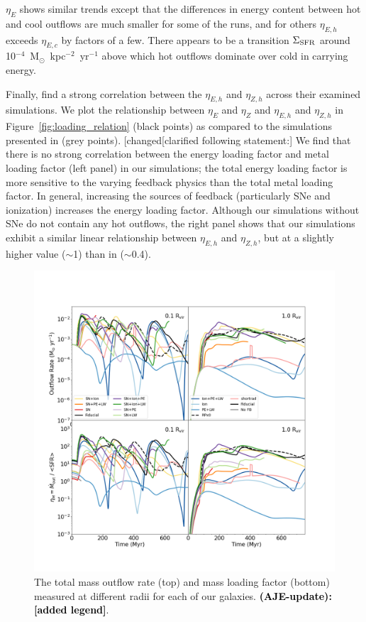 \documentclass[twocolumn]{aastex62}
\newcommand{\changed}[1]{\textcolor{black}{\textbf{(AJE-update): #1}}}
\begin{document}
$\eta_E$ shows similar trends except that the differences in energy content between hot and cool outflows are much smaller for some of the runs, and for others $\eta_{E,h}$ exceeds $\eta_{E,c}$ by factors of a few. There appears to be a transition $\Sigma_{\rm SFR}$ around 10$^{-4}$~M$_{\odot}$~kpc$^{-2}$~yr$^{-1}$ above which hot outflows dominate over cold in carrying energy. 

Finally, \citet{LiBryan2020} find a strong correlation between the $\eta_{E,h}$ and $\eta_{Z,h}$ across their examined simulations. We plot the relationship between $\eta_{E}$ and $\eta_{Z}$ and $\eta_{E,h}$ and $\eta_{Z,h}$ in Figure~\ref{fig:loading_relation} (black points) as compared to the simulations presented in \citet{LiBryan2020} (grey points). [changed{[clarified following statement:] We find that there is no strong correlation between the energy loading factor and metal loading factor (left panel) in our simulations; the total energy loading factor is more sensitive to the varying feedback physics than the total metal loading factor. In general, increasing the sources of feedback (particularly SNe and ionization) increases the energy loading factor.} Although our simulations without SNe do not contain any hot outflows, the right panel shows that our simulations exhibit a similar linear relationship between $\eta_{E,h}$ and $\eta_{Z,h}$, but at a slightly higher value ($\sim$1) than in \citet{LiBryan2020} ($\sim$0.4).


\begin{figure}
  \centering
  \includegraphics[width=0.95\linewidth]{figures/physics_comparison_outflow_loading}
  \caption{The total mass outflow rate (top) and mass loading factor (bottom) measured at different radii for each of our galaxies. \changed{[added legend]}.}
  \label{fig:outflow_evolution}
\end{figure}
\end{document}
